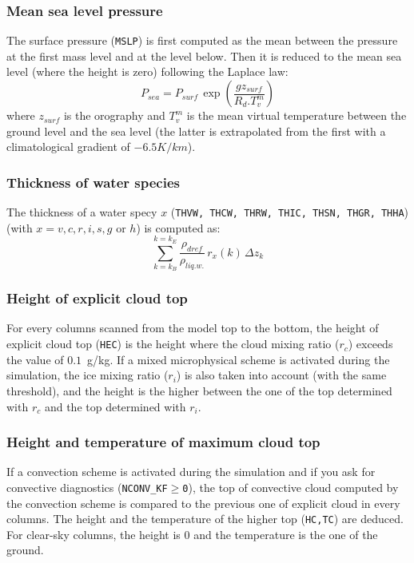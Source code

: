 \subsubsection{Mean sea level pressure}
The surface pressure ({\tt MSLP}) is first computed as the mean between 
the pressure at the first mass level and at the level below. 
Then it is reduced to the mean sea level (where the height is zero)
following the Laplace law:
\begin{equation}
P_{sea}=P_{surf} \, \exp\left(\dfrac{gz_{surf}} {R_d . T_v^m}\right)
\end{equation}
where $z_{surf}$ is the orography and 
$T_v^m$ is the mean virtual temperature between the ground level 
and the sea level (the latter is extrapolated from the first with a 
climatological gradient of $-6.5K/km$).


\subsubsection{Thickness of water species}
The thickness of a water specy $x$
({\tt THVW, THCW, THRW, THIC, THSN, THGR, THHA})
(with $x=v,c,r,i,s,g \mbox{ or } h$) is computed as:
\begin{equation}
\sum_{k=k_B}^{k=k_E}\frac{\rho_{dref}}{\rho_{liq.w.}} \, r_x(k) \, \Delta z_k
\end{equation}

\subsubsection{Height of explicit cloud top }
For every columns scanned from the model top to the bottom, the height of 
explicit cloud top ({\tt HEC}) is the height where the
cloud mixing ratio ($r_c$) exceeds the value of $0.1$~g/kg. 
If a mixed microphysical scheme is activated during the simulation,
the ice mixing ratio ($r_i$) is also taken into account 
(with the same threshold), 
and the height is the higher between the one of 
the top determined with $r_c$ and the top determined with $r_i$.


\subsubsection{Height and temperature of maximum cloud top}
If a convection scheme is activated during the simulation and if you ask for
convective diagnostics ({\tt NCONV\_KF$\ge$0}), the top of convective cloud
computed by the convection scheme is compared to the previous one of
 explicit cloud in every columns. The height and the temperature of the
higher top ({\tt HC,TC}) are deduced.
For clear-sky columns, the height is $0$ and the
temperature is the one of the ground.

